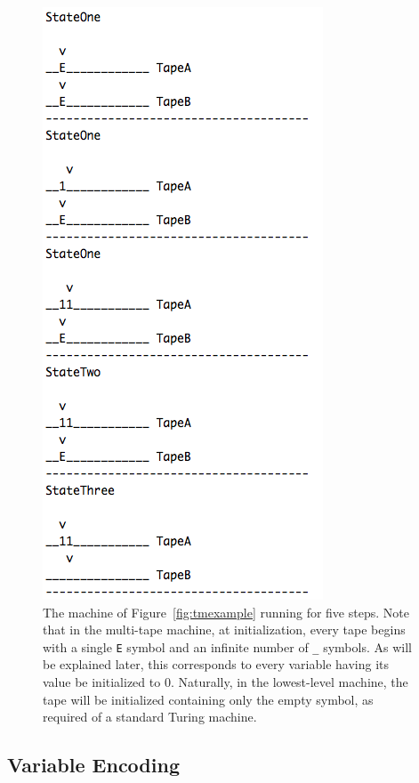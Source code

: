 \documentclass[11pt]{report}
\begin{document}
\begin{figure} 
\begin{center} 
\includegraphics[scale=0.8]{figs/behavior.png} 
\caption{The machine of Figure~\ref{fig:tmexample} running for five steps. Note that in the multi-tape machine, at initialization, every tape begins with a single \texttt{E} symbol and an infinite number of \texttt{\_} symbols. As will be explained later, this corresponds to every variable having its value be initialized to 0. Naturally, in the lowest-level machine, the tape will be initialized containing only the empty symbol, as required of a standard Turing machine. \label{fig:behavior}} 
\end{center} 
\end{figure}

\subsection{Variable Encoding}
\end{document}
